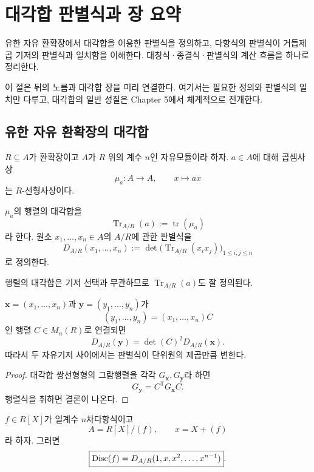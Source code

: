 \clearpage
\section{대각합 판별식과 장 요약}
\label{sec:trace-discriminant-review}

\begin{learninggoal}
유한 자유 환확장에서 대각합을 이용한 판별식을 정의하고, 다항식의 판별식이 거듭제곱 기저의 판별식과 일치함을 이해한다. 대칭식·종결식·판별식의 계산 흐름을 하나로 정리한다.
\end{learninggoal}

이 절은 뒤의 노름과 대각합 장을 미리 연결한다. 여기서는 필요한 정의와 판별식의 일치만 다루고, 대각합의 일반 성질은 Chapter 5에서 체계적으로 전개한다.

\subsection{유한 자유 환확장의 대각합}

$R\subseteq A$가 환확장이고 $A$가 $R$ 위의 계수 $n$인 자유모듈이라 하자. $a\in A$에 대해 곱셈사상
\[
  \mu_a:A\to A,
  \qquad x\longmapsto ax
\]
는 $R$-선형사상이다.

\begin{definition}
$\mu_a$의 행렬의 대각합을
\[
  \operatorname{Tr}_{A/R}(a)
  :=\operatorname{tr}(\mu_a)
\]
라 한다. 원소 $x_1,\dots,x_n\in A$의 $A/R$에 관한 판별식을
\[
  D_{A/R}(x_1,\dots,x_n)
  :=\det\bigl(
  \operatorname{Tr}_{A/R}(x_ix_j)
  \bigr)_{1\le i,j\le n}
\]
로 정의한다.
\end{definition}

행렬의 대각합은 기저 선택과 무관하므로 $\operatorname{Tr}_{A/R}(a)$도 잘 정의된다.

\begin{proposition}[기저변환]
$\mathbf x=(x_1,\dots,x_n)$과 $\mathbf y=(y_1,\dots,y_n)$가
\[
  (y_1,\dots,y_n)=(x_1,\dots,x_n)C
\]
인 행렬 $C\in M_n(R)$로 연결되면
\[
  D_{A/R}(\mathbf y)
  =\det(C)^2D_{A/R}(\mathbf x).
\]
따라서 두 자유기저 사이에서는 판별식이 단위원의 제곱만큼 변한다.
\end{proposition}

\begin{proof}
대각합 쌍선형형의 그람행렬을 각각 $G_{\mathbf x},G_{\mathbf y}$라 하면
\[
  G_{\mathbf y}=C^{\mathsf T}G_{\mathbf x}C.
\]
행렬식을 취하면 결론이 나온다.
\end{proof}

\begin{theorem}
\label{thm:power-basis-discriminant}
$f\in R[X]$가 일계수 $n$차다항식이고
\[
  A=R[X]/(f),
  \qquad x=X+(f)
\]
라 하자. 그러면
\[
  \boxed{
  \operatorname{Disc}(f)
  =D_{A/R}(1,x,x^2,\dots,x^{n-1})
  }.
\]
\end{theorem}

